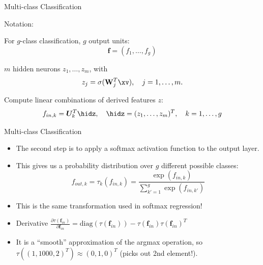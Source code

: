 \begin{frame} {Multi-class Classification}
\vspace{5mm}
\begin{blocki}{Notation:}
\item For $g$-class classification, $g$ output units: $$\mathbf{f} = (f_1, \dots, f_g)$$
\vspace{4mm}
\item $m$ hidden neurons $z_1, \dots, z_m$, with
    $$ z_j = \sigma(\mathbf{W}_j^T \xv), \quad j = 1,\ldots,m. $$
\item Compute linear combinations of derived features $z$:
    $$ f_{in,k} = \bm{U}_k^T \hidz, \quad \hidz=(z_1,\dots, z_m)^T, \quad k = 1,\ldots,g$$
\end{blocki}
\end{frame}

\begin{frame} {Multi-class Classification}
  \begin{itemize}
    \item The second step is to apply a softmax activation function to the output layer.
    \vspace{4mm}
    \item This gives us a probability distribution over $g$ different possible classes:
    $$ f_{out,k} = \tau_k(f_{in,k}) = \frac{\exp(f_{in,k})}{\sum_{k'=1}^g\exp(f_{in,k'})}$$
    \vspace{2mm}
    \item This is the same transformation used in softmax regression!
    \vspace{4mm}
    \item Derivative $ \frac{\partial \tau(\mathbf{f}_{in})}{\partial \mathbf{f}_{in}} = \text{diag}(\tau(\mathbf{f}_{in})) - \tau(\mathbf{f}_{in}) \tau(\mathbf{f}_{in})^T $
    \vspace{4mm}
    \item It is a \enquote{smooth} approximation of the argmax operation,
        so $\tau((1, 1000, 2)^T) \approx (0, 1, 0)^T$ (picks out 2nd element!).
  \end{itemize}
\end{frame}

